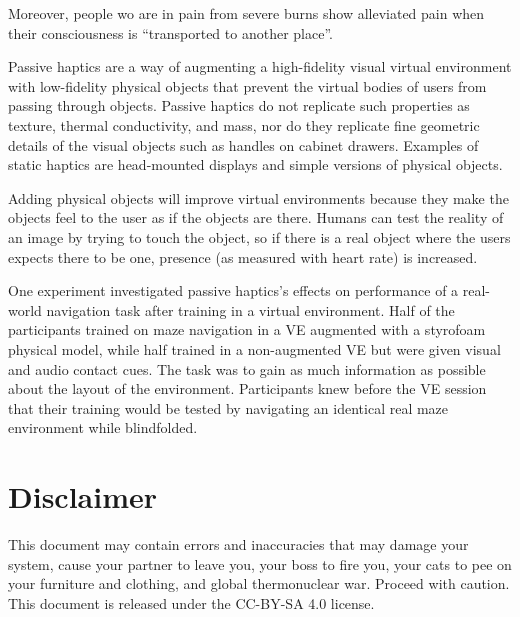 \documentclass[a4paper]{article}
\begin{document}
Moreover, people wo are in pain from severe burns show alleviated pain
when their consciousness is ``transported to another place''.

Passive haptics are a way of augmenting a high-fidelity visual virtual
environment with low-fidelity physical objects that prevent the virtual
bodies of users from passing through objects. Passive haptics do not
replicate such properties as texture, thermal conductivity, and mass,
nor do they replicate fine geometric details of the visual objects such
as handles on cabinet drawers. Examples of static haptics are
head-mounted displays and simple versions of physical objects.

Adding physical objects will improve virtual environments because they
make the objects feel to the user as if the objects are there. Humans
can test the reality of an image by trying to touch the object, so if
there is a real object where the users expects there to be one, presence
(as measured with heart rate) is increased.

One experiment investigated passive haptics's effects on performance of
a real-world navigation task after training in a virtual environment.
Half of the participants trained on maze navigation in a VE augmented
with a styrofoam physical model, while half trained in a non-augmented
VE but were given visual and audio contact cues. The task was to gain as
much information as possible about the layout of the environment.
Participants knew before the VE session that their training would be
tested by navigating an identical real maze environment while
blindfolded.


\section{Disclaimer}

This document may contain errors and inaccuracies that may damage your
system, cause your partner to leave you, your boss to fire you, your
cats to pee on your furniture and clothing, and global thermonuclear
war. Proceed with caution. This document is released under the CC-BY-SA
4.0 license. \ccbysa
\end{document}
